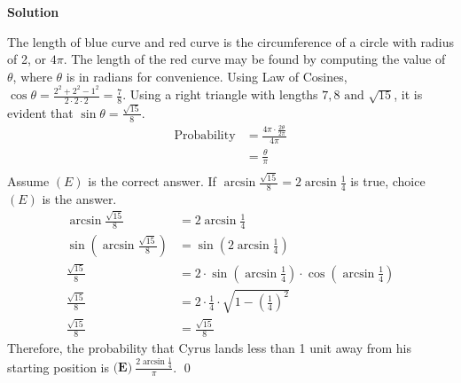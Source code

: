 \documentclass{article}
\newenvironment{solution}{\begin{trivlist}\item[]
{\bf Solution}}{\qed \end{trivlist}}
\begin{document}
\begin{solution}
\begin{center}
\end{center}
The length of blue curve and red curve is the circumference
of a circle with radius of 2, or $4\pi$. The length of the
red curve may be found by computing the value of $\theta$,
where $\theta$ is in radians for convenience. Using Law of
Cosines, $\cos\theta = \frac{2^2 + 2^2 - 1^2}
{2 \cdot 2 \cdot 2} = \frac{7}{8}$. Using a right triangle
with lengths $7, 8 \text{ and } \sqrt{15}$, it is evident
that $\sin\theta = \frac{\sqrt{15}}{8}$.
\begin{align*}
    \text{Probability}
    &= \frac{ 4 \pi \cdot \frac{2\theta}{2\pi} }{4\pi} \\
    &=\frac{\theta}{\pi}\\
\end{align*}
Assume $(E)$ is the correct answer. If
$\arcsin{\frac{\sqrt{15}}{8}} = 2 \arcsin{\frac{1}{4}}$
is true, choice $(E)$ is the answer.
\begin{align*}
    \arcsin{ \frac{\sqrt{15}}{8} }
    &= 2 \arcsin{\frac{1}{4}} \\
    \sin\left( \arcsin{ \frac{\sqrt{15}}{8}} \right)
    &= \sin\left( 2 \arcsin{ \frac{1}{4} } \right) \\
    \frac{\sqrt{15}}{8} &= 2 \cdot
    \sin\left( \arcsin{ \frac{1}{4} } \right) \cdot
    \cos\left( \arcsin{ \frac{1}{4} } \right) \\
    \frac{\sqrt{15}}{8} &= 2 \cdot \frac{1}{4} \cdot
    \sqrt{1 - \left( \frac{1}{4} \right)^2} \\
    \frac{\sqrt{15}}{8} &= \frac{\sqrt{15}}{8}
\end{align*}
Therefore, the probability that Cyrus lands less
than 1 unit away from his starting position is
$\boxed{\textbf{(E)}~\frac{2\arcsin \frac{1}{4}}{\pi}}$.
\end{solution}
\end{document}
